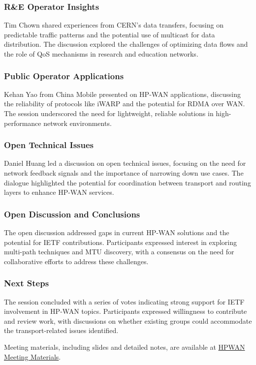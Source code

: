 \documentclass{article}
\begin{document}
\subsubsection{R\&E Operator Insights}
Tim Chown shared experiences from CERN's data transfers, focusing on predictable traffic patterns and the potential use of multicast for data distribution. The discussion explored the challenges of optimizing data flows and the role of QoS mechanisms in research and education networks.

\subsubsection{Public Operator Applications}
Kehan Yao from China Mobile presented on HP-WAN applications, discussing the reliability of protocols like iWARP and the potential for RDMA over WAN. The session underscored the need for lightweight, reliable solutions in high-performance network environments.

\subsubsection{Open Technical Issues}
Daniel Huang led a discussion on open technical issues, focusing on the need for network feedback signals and the importance of narrowing down use cases. The dialogue highlighted the potential for coordination between transport and routing layers to enhance HP-WAN services.

\subsubsection{Open Discussion and Conclusions}
The open discussion addressed gaps in current HP-WAN solutions and the potential for IETF contributions. Participants expressed interest in exploring multi-path techniques and MTU discovery, with a consensus on the need for collaborative efforts to address these challenges.

\subsubsection{Next Steps}
The session concluded with a series of votes indicating strong support for IETF involvement in HP-WAN topics. Participants expressed willingness to contribute and review work, with discussions on whether existing groups could accommodate the transport-related issues identified.

Meeting materials, including slides and detailed notes, are available at \href{https://example.com/hpwan-materials}{HPWAN Meeting Materials}.
\end{document}
